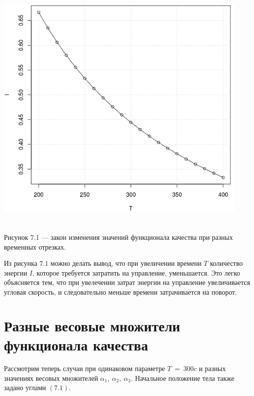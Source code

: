\documentclass[14pt]{extreport}
\begin{document}
\begin{center}
\includegraphics[width=12.5cm, height=12.5cm]{lat.png}

Рисунок 7.1 --- закон изменения значений функционала качества при разных временных отрезках. 
\end{center}

Из рисунка $7.1$ можно делать вывод, что при увеличении времени $T$ количество энергии $I$, которое требуется затратить на управление, уменьшается.
Это легко объясняется тем, что при увелечении затрат энергии на управление увеличивается угловая скорость, и следовательно меньше времени 
затрачивается на поворот.


\section{Разные весовые множители функционала качества}

Рассмотрим теперь случаи при одинаковом параметре $T\ =\ 300c$ и разных значениях весовых множителей $\alpha_1,\ \alpha_2,\ \alpha_3.$
Начальное положение тела также задано углами $(7.1)$.
\end{document}
